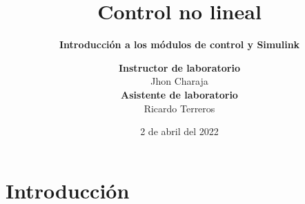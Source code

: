 

\title[Laboratorio 0]{Control no lineal}
\subtitle{\textbf{Introducción a los módulos de control y Simulink}}

\author[J. Charaja and R. Terreros (UTEC)]{\textbf{Instructor de laboratorio} \\Jhon Charaja\\ \vspace{1em} \textbf{Asistente de laboratorio} \\Ricardo Terreros}


\date{2 de abril del 2022}



\graphicspath{{imgs/}}
\frame{\titlepage}





\section{Introducción}

